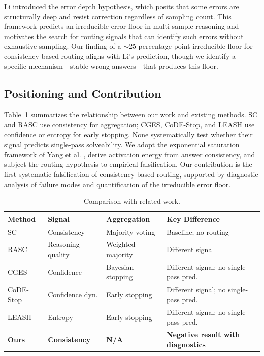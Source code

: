 \documentclass{article}
\begin{document}
Li \citep{li2026errordepth} introduced the error depth hypothesis, which posits that some errors are structurally deep and resist correction regardless of sampling count. This framework predicts an irreducible error floor in multi-sample reasoning and motivates the search for routing signals that can identify such errors without exhaustive sampling. Our finding of a $\sim$25 percentage point irreducible floor for consistency-based routing aligns with Li's prediction, though we identify a specific mechanism---stable wrong answers---that produces this floor.

\subsection{Positioning and Contribution}

Table~\ref{tab:related} summarizes the relationship between our work and existing methods. SC and RASC use consistency for aggregation; CGES, CoDE-Stop, and LEASH use confidence or entropy for early stopping. None systematically test whether their signal predicts single-pass solveability. We adopt the exponential saturation framework of Yang et al. \citep{yang2024probabilistic}, derive activation energy from answer consistency, and subject the routing hypothesis to empirical falsification. Our contribution is the first systematic falsification of consistency-based routing, supported by diagnostic analysis of failure modes and quantification of the irreducible error floor.

\begin{table}[t]
\caption{Comparison with related work.}
\label{tab:related}
\centering
\small
\begin{tabular}{@{}p{2.6cm}p{2.4cm}p{2.2cm}p{4.8cm}@{}}
\toprule
Method & Signal & Aggregation & Key Difference \\
\midrule
SC \citep{wang2023selfconsistency} & Consistency & Majority voting & Baseline; no routing \\
RASC \citep{wan2024rasc} & Reasoning quality & Weighted majority & Different signal \\
CGES \citep{aghazadeh2023cges} & Confidence & Bayesian stopping & Different signal; no single-pass pred. \\
CoDE-Stop \citep{qin2024codestop} & Confidence dyn. & Early stopping & Different signal; no single-pass pred. \\
LEASH \citep{leash2024} & Entropy & Early stopping & Different signal; no single-pass pred. \\
\textbf{Ours} & \textbf{Consistency} & \textbf{N/A} & \textbf{Negative result with diagnostics} \\
\bottomrule
\end{tabular}
\end{table}
\end{document}
